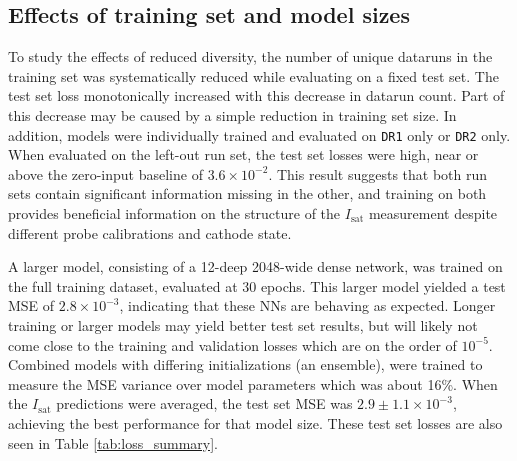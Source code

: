 \subsection{Effects of training set and model sizes}
 
To study the effects of reduced diversity, the number of unique dataruns in the training set was systematically reduced while evaluating on a fixed test set. The test set loss monotonically increased with this decrease in datarun count. Part of this decrease may be caused by a simple reduction in training set size. In addition, models were individually trained and evaluated on \texttt{DR1} only or  \texttt{DR2} only. When evaluated on the left-out run set, the test set losses were high, near or above the zero-input baseline of $3.6 \times 10^{-2}$. This result suggests that both run sets contain significant information missing in the other, and training on both provides beneficial information on the structure of the $I_\text{sat}$ measurement despite different probe calibrations and cathode state.

A larger model, consisting of a 12-deep 2048-wide dense network, was trained on the full training dataset, evaluated at 30 epochs. This larger model yielded a test MSE of $2.8 \times 10^{-3}$, indicating that these NNs are behaving as expected. Longer training or larger models may yield better test set results, but will likely not come close to the training and validation losses which are on the order of $10^{-5}$. Combined models with differing initializations (an ensemble), were trained to measure the MSE variance over model parameters which was about 16\%. When the $I_\text{sat}$ predictions were averaged, the test set MSE was $2.9 \pm 1.1 \times 10^{-3}$, achieving the best performance for that model size. These test set losses are also seen in Table \ref{tab:loss_summary}. 



